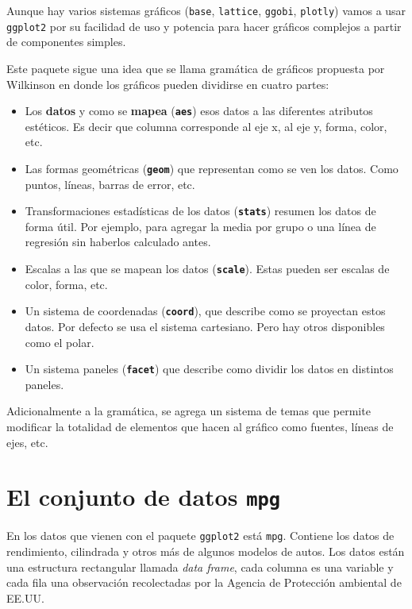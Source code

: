 \documentclass[]{book}
\providecommand{\tightlist}{%
  \setlength{\itemsep}{0pt}\setlength{\parskip}{0pt}}
\theoremstyle{definition}
\theoremstyle{definition}
\theoremstyle{definition}
\theoremstyle{remark}
\begin{document}
Aunque hay varios sistemas gráficos (\texttt{base}, \texttt{lattice},
\texttt{ggobi}, \texttt{plotly}) vamos a usar \texttt{ggplot2} por su
facilidad de uso y potencia para hacer gráficos complejos a partir de
componentes simples.

Este paquete sigue una idea que se llama gramática de gráficos propuesta
por Wilkinson en donde los gráficos pueden dividirse en cuatro partes:

\begin{itemize}
\tightlist
\item
  Los \textbf{datos} y como se \textbf{mapea} (\textbf{\texttt{aes}})
  esos datos a las diferentes atributos estéticos. Es decir que columna
  corresponde al eje x, al eje y, forma, color, etc.
\item
  Las formas geométricas (\textbf{\texttt{geom}}) que representan como
  se ven los datos. Como puntos, líneas, barras de error, etc.
\item
  Transformaciones estadísticas de los datos (\textbf{\texttt{stats}})
  resumen los datos de forma útil. Por ejemplo, para agregar la media
  por grupo o una línea de regresión sin haberlos calculado antes.
\item
  Escalas a las que se mapean los datos (\textbf{\texttt{scale}}). Estas
  pueden ser escalas de color, forma, etc.
\item
  Un sistema de coordenadas (\textbf{\texttt{coord}}), que describe como
  se proyectan estos datos. Por defecto se usa el sistema cartesiano.
  Pero hay otros disponibles como el polar.
\item
  Un sistema paneles (\textbf{\texttt{facet}}) que describe como dividir
  los datos en distintos paneles.
\end{itemize}

Adicionalmente a la gramática, se agrega un sistema de temas que permite
modificar la totalidad de elementos que hacen al gráfico como fuentes,
líneas de ejes, etc.

\hypertarget{el-conjunto-de-datos-mpg}{%
\section{\texorpdfstring{El conjunto de datos
\texttt{mpg}}{El conjunto de datos mpg}}\label{el-conjunto-de-datos-mpg}}

En los datos que vienen con el paquete \texttt{ggplot2} está
\texttt{mpg}. Contiene los datos de rendimiento, cilindrada y otros más
de algunos modelos de autos. Los datos están una estructura rectangular
llamada \emph{data frame}, cada columna es una variable y cada fila una
observación recolectadas por la Agencia de Protección ambiental de
EE.UU.
\end{document}
